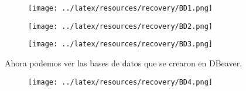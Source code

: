 \begin{figure}[H]
    \centering
        \texttt{[image: ../latex/resources/recovery/BD1.png]}
\end{figure}

\begin{figure}[H]
    \centering
        \texttt{[image: ../latex/resources/recovery/BD2.png]}
\end{figure}

\begin{figure}
    \centering
        \texttt{[image: ../latex/resources/recovery/BD3.png]}
\end{figure}

\newpage

Ahora podemos ver las bases de datos que se crearon en DBeaver. \vspace{0.3cm}

\begin{figure}[H]
    \centering
        \texttt{[image: ../latex/resources/recovery/BD4.png]}
\end{figure}